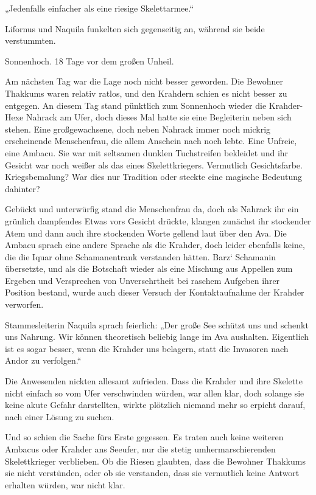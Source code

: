 „Jedenfalls einfacher als eine riesige Skelettarmee.“

Lifornus und Naquila funkelten sich gegenseitig an, während sie beide verstummten.



\trennzeichen



Sonnenhoch. 18 Tage vor dem großen Unheil.\bigskip



Am nächsten Tag war die Lage noch nicht besser geworden. Die Bewohner Thakkums waren relativ ratlos, und den Krahdern schien es nicht besser zu entgegen. An diesem Tag stand pünktlich zum Sonnenhoch wieder die Krahder-Hexe Nahrack am Ufer, doch dieses Mal hatte sie eine Begleiterin neben sich stehen. Eine großgewachsene, doch neben Nahrack immer noch mickrig erscheinende Menschenfrau, die allem Anschein nach noch lebte. Eine Unfreie, eine Ambacu. Sie war mit seltsamen dunklen Tuchstreifen bekleidet und ihr Gesicht war noch weißer als das eines Skelettkriegers. Vermutlich Gesichtsfarbe. Kriegsbemalung? War dies nur Tradition oder steckte eine magische Bedeutung dahinter?

Gebückt und unterwürfig stand die Menschenfrau da, doch als Nahrack ihr ein grünlich dampfendes Etwas vors Gesicht drückte, klangen zunächst ihr stockender Atem und dann auch ihre stockenden Worte gellend laut über den Ava. Die Ambacu sprach eine andere Sprache als die Krahder, doch leider ebenfalls keine, die die Iquar ohne Schamanentrank verstanden hätten. Barz‘ Schamanin übersetzte, und als die Botschaft wieder als eine Mischung aus Appellen zum Ergeben und Versprechen von Unversehrtheit bei raschem Aufgeben ihrer Position bestand, wurde auch dieser Versuch der Kontaktaufnahme der Krahder verworfen.

Stammesleiterin Naquila sprach feierlich: „Der große See schützt uns und schenkt uns Nahrung. Wir können theoretisch beliebig lange im Ava aushalten. Eigentlich ist es sogar besser, wenn die Krahder uns belagern, statt die Invasoren nach Andor zu verfolgen.“

Die Anwesenden nickten allesamt zufrieden. Dass die Krahder und ihre Skelette nicht einfach so vom Ufer verschwinden würden, war allen klar, doch solange sie keine akute Gefahr darstellten, wirkte plötzlich niemand mehr so erpicht darauf, nach einer Lösung zu suchen.

Und so schien die Sache fürs Erste gegessen. Es traten auch keine weiteren Ambacus oder Krahder ans Seeufer, nur die stetig umhermarschierenden Skelettkrieger verblieben. Ob die Riesen glaubten, dass die Bewohner Thakkums sie nicht verstünden, oder ob sie verstanden, dass sie vermutlich keine Antwort erhalten würden, war nicht klar.

